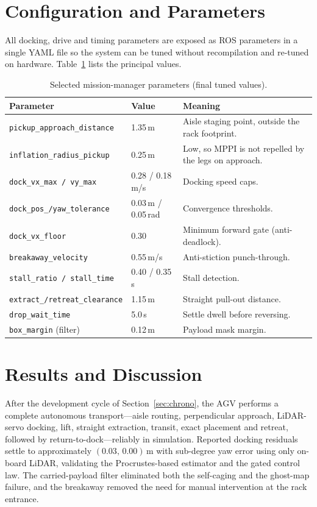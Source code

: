 \documentclass[11pt,a4paper]{article}
\newcommand{\code}[1]{\texttt{\small #1}}
\begin{document}
\section{Configuration and Parameters}\label{sec:config}
All docking, drive and timing parameters are exposed as ROS parameters in a
single YAML file so the system can be tuned without recompilation and
re-tuned on hardware. Table~\ref{tab:params} lists the principal values.

\begin{table}[h]\centering\small
\caption{Selected mission-manager parameters (final tuned values).}\label{tab:params}
\begin{tabular}{@{}llp{6.6cm}@{}}
\toprule
\textbf{Parameter} & \textbf{Value} & \textbf{Meaning}\\
\midrule
\code{pickup\_approach\_distance} & 1.35\,m & Aisle staging point, outside the rack footprint.\\
\code{inflation\_radius\_pickup}  & 0.25\,m & Low, so MPPI is not repelled by the legs on approach.\\
\code{dock\_vx\_max / vy\_max}     & 0.28 / 0.18\,m/s & Docking speed caps.\\
\code{dock\_pos\_/yaw\_tolerance}  & 0.03\,m / 0.05\,rad & Convergence thresholds.\\
\code{dock\_vx\_floor}            & 0.30 & Minimum forward gate (anti-deadlock).\\
\code{breakaway\_velocity}        & 0.55\,m/s & Anti-stiction punch-through.\\
\code{stall\_ratio / stall\_time} & 0.40 / 0.35\,s & Stall detection.\\
\code{extract\_/retreat\_clearance} & 1.15\,m & Straight pull-out distance.\\
\code{drop\_wait\_time}           & 5.0\,s & Settle dwell before reversing.\\
\code{box\_margin} (filter)       & 0.12\,m & Payload mask margin.\\
\bottomrule
\end{tabular}
\end{table}

\section{Results and Discussion}\label{sec:results}
After the development cycle of Section~\ref{sec:chrono}, the AGV performs a
complete autonomous transport---aisle routing, perpendicular approach,
LiDAR-servo docking, lift, straight extraction, transit, exact placement and
retreat, followed by return-to-dock---reliably in simulation. Reported
docking residuals settle to approximately $(0.03,\,0.00)$\,m with sub-degree
yaw error using only on-board LiDAR, validating the Procrustes-based
estimator and the gated control law. The carried-payload filter eliminated
both the self-caging and the ghost-map failure, and the breakaway removed the
need for manual intervention at the rack entrance.
\end{document}
